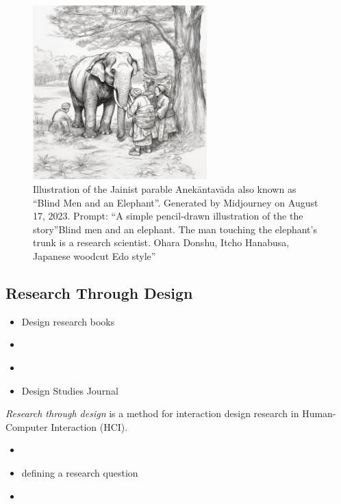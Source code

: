 \documentclass[
  letterpaper,
  DIV=11,
  numbers=noendperiod]{scrartcl}
\providecommand{\tightlist}{%
  \setlength{\itemsep}{0pt}\setlength{\parskip}{0pt}}\usepackage{longtable,booktabs,array}
\begin{document}
\begin{figure}[H]

{\centering \includegraphics[width=0.6\textwidth,height=\textheight]{./images/elephant.png}

}

\caption{Illustration of the Jainist parable Anekāntavāda also known as
``Blind Men and an Elephant''. Generated by Midjourney on August 17,
2023. Prompt: ``A simple pencil-drawn illustration of the the
story''Blind men and an elephant. The man touching the elephant's trunk
is a research scientist. Ohara Donshu, Itcho Hanabusa, Japanese woodcut
Edo style''}

\end{figure}%

\subsection{Research Through Design}\label{research-through-design}

\begin{itemize}
\tightlist
\item
  Design research books
\item
  \citet{koskinenDesignResearchPractice2011}
\item
  \citet{riesLeanStartupHow2011}
\item
  Design Studies Journal
\end{itemize}

\emph{Research through design} is a method for interaction design
research in Human-Computer Interaction (HCI).

\begin{itemize}
\item
  \citet{zimmermanResearchDesignMethod2007}
\item
  \citet{salovaaraHowDefineResearch2020} defining a research question
\item
  \citet{nunnallyUXResearchPractical2016}
\end{itemize}
\end{document}
